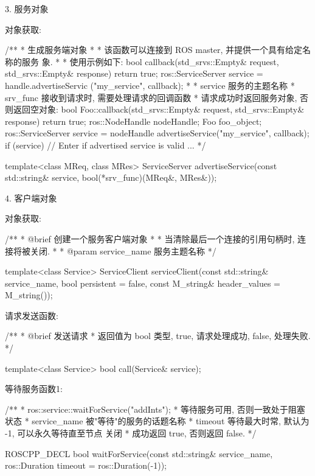 \documentclass[openany, fontset=windowsold]{ctexbook}
\theoremstyle{kaiti}
\theoremstyle{normal}
\begin{document}
3. 服务对象

对象获取:

\begin{cpp}
  /**
   * \brief 生成服务端对象
   *
   * 该函数可以连接到 ROS master, 并提供一个具有给定名称的服务 象.
   *
   * 使用示例如下:
   \verbatim
   bool callback(std_srvs::Empty& request, std_srvs::Empty& response)
   {
   return true;
   } 
   ros::ServiceServer service = handle.advertiseServic ("my_service", callback);
   \endverbatim
   *
   * \param service 服务的主题名称
   * \param srv_func 接收到请求时, 需要处理请求的回调函数
   * \return 请求成功时返回服务对象, 否则返回空对象:
   \verbatim
   bool Foo::callback(std_srvs::Empty& request, std_srvs::Empty& response)
   {
   return true;
   }
   ros::NodeHandle nodeHandle;
   Foo foo_object;
   ros::ServiceServer service = nodeHandle advertiseService("my_service", callback);
   if (service) // Enter if advertised service is valid
   {
   ...
   }
   \endverbatim 
   */

  template<class MReq, class MRes>
  ServiceServer advertiseService(const std::string& service, bool(*srv_func)(MReq&, MRes&));
\end{cpp}

4. 客户端对象

对象获取:

\begin{cpp}
  /** 
   * @brief 创建一个服务客户端对象
   *
   * 当清除最后一个连接的引用句柄时, 连接将被关闭.
   *
   * @param service_name 服务主题名称
   */

  template<class Service>
  ServiceClient serviceClient(const std::string& service_name, bool persistent = false, 
                              const M_string& header_values = M_string());
\end{cpp}

请求发送函数:

\begin{cpp}
  /**
   * @brief 发送请求
   * 返回值为 bool 类型, true, 请求处理成功, false, 处理失败.
   */
    
    template<class Service>
    bool call(Service& service);
\end{cpp}

等待服务函数1:

\begin{cpp}
  /**
   * ros::service::waitForService("addInts");
   * \brief 等待服务可用, 否则一致处于阻塞状态
   * \param service_name 被"等待"的服务的话题名称
   * \param timeout 等待最大时常, 默认为 -1, 可以永久等待直至节点 关闭
   * \return 成功返回 true, 否则返回 false.
   */

  ROSCPP_DECL bool waitForService(const std::string& service_name, ros::Duration timeout = ros::Duration(-1));
\end{cpp}
\end{document}
